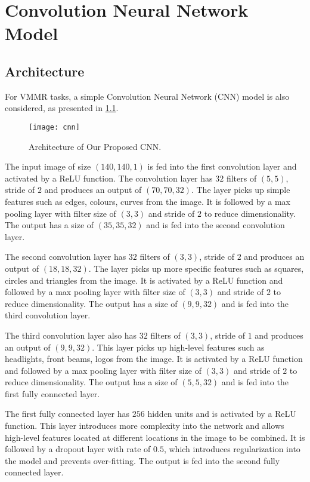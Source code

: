 \chapter{Convolution Neural Network Model}
\label{chap:cnn}

\section{Architecture}
For VMMR tasks, a simple Convolution Neural Network (CNN) model is also considered, as presented in \ref{fig:cnn}.

\begin{figure}
\centering
\texttt{[image: cnn]}
\caption{Architecture of Our Proposed CNN.}
\label{fig:cnn}
\end{figure}

The input image of size $(140, 140, 1)$ is fed into the first convolution layer and activated by a ReLU function. The convolution layer has $32$ filters of $(5, 5)$, stride of $2$ and produces an output of $(70, 70, 32)$.
The layer picks up simple features such as edges, colours, curves from the image.
It is followed by a max pooling layer with filter size of $(3, 3)$ and stride of $2$ to reduce dimensionality. The output has a size of $(35, 35, 32)$ and is fed into the second convolution layer.

The second convolution layer has $32$ filters of $(3, 3)$, stride of $2$ and produces an output of $(18, 18, 32)$. 
The layer picks up more specific features such as squares, circles and triangles from the image.
It is activated by a ReLU function and followed by a max pooling layer with filter size of $(3, 3)$ and stride of $2$ to reduce dimensionality. The output has a size of $(9, 9, 32)$ and is fed into the third convolution layer.

The third convolution layer also has $32$ filters of $(3, 3)$, stride of $1$ and produces an output of $(9, 9, 32)$. 
This layer picks up high-level features such as headlights, front beams, logos from the image.
It is activated by a ReLU function and followed by a max pooling layer with filter size of $(3, 3)$ and stride of $2$ to reduce dimensionality. The output has a size of $(5, 5, 32)$ and is fed into the first fully connected layer.

The first fully connected layer has $256$ hidden units and is activated by a ReLU function. This layer introduces more complexity into the network and allows high-level features located at different locations in the image to be combined.
It is followed by a dropout layer with rate of $0.5$, which introduces regularization into the model and prevents over-fitting.
The output is fed into the second fully connected layer.

